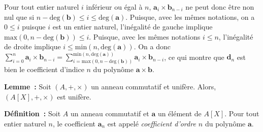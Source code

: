\begin{itemize}[nosep]
\begin{itemize}[nosep]
                Pour tout entier naturel $i$ inférieur ou égal à $n$, $\mathbf{a}_i \times \mathbf{b}_{n-i}$ ne peut donc être non nul que si $n - \mathrm{deg}(\mathbf{b}) \leq i \leq \mathrm{deg}(\mathbf{a})$.
                Puisque, avec les mêmes notations, on a $0 \leq i$ puisque $i$ est un entier naturel, l'inégalité de gauche implique $\mathrm{max}(0, n - \mathrm{deg}(\mathbf{b})) \leq i$.
                Puisque, avec les mêmes notations $i \leq n$, l'inégalité de droite implique $i \leq \mathrm{min}(n, \mathrm{deg}(\mathbf{a}))$.
                On a donc $\sum_{i = 0}^n \mathbf{a}_i \times \mathbf{b}_{n-i} = \sum_{i = \mathrm{max}(0, n - \mathrm{deg}(\mathbf{b}))}^{\mathrm{min}(n, \mathrm{deg}(\mathbf{a}))} \mathbf{a}_i \times \mathbf{b}_{n-i}$, ce qui montre que $\mathbf{d}_n$ est bien le coefficient d'indice $n$ du polynôme $\mathbf{a} \times \mathbf{b}$.
        \end{itemize}
\end{itemize}

\done

\medskip

\noindent\textbf{Lemme :} Soit $(A, +, \times)$ un anneau commutatif et unifère. 
    Alors, $(A[X], +, \times)$ est unifère.

\medskip

\noindent\textbf{Définition :} Soit $A$ un anneau commutatif et $\mathbf{a}$ un élément de $A[X]$.
    Pour tout entier naturel $n$, le coefficient $\mathbf{a}_n$ est appelé \emph{coefficient d'ordre $n$} du polynôme $\mathbf{a}$.

\medskip


